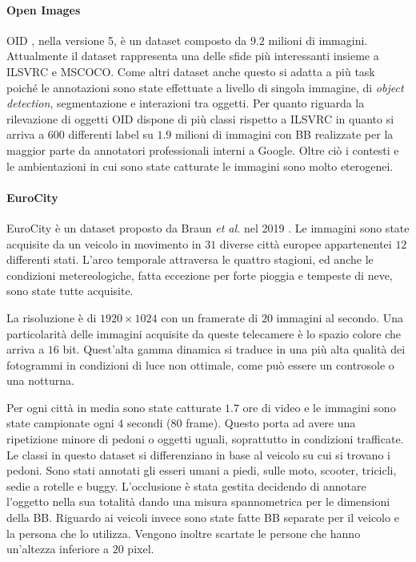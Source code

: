 \paragraph{Open Images} 
\ac{OID} \cite{krasin2017openimages}, nella versione 5, è un dataset composto da $9.2$ milioni di immagini. Attualmente il dataset rappresenta una delle sfide più interessanti insieme a \ac{ILSVRC} e \ac{MSCOCO}. Come altri dataset anche questo si adatta a più task poiché le annotazioni sono state effettuate a livello di singola immagine, di \textit{object detection}, segmentazione e interazioni tra oggetti. 
Per quanto riguarda la rilevazione di oggetti \ac{OID} dispone di più classi rispetto a \ac{ILSVRC} in quanto si arriva a $600$ differenti label su $1.9$ milioni di immagini con \ac{BB} realizzate per la maggior parte da annotatori professionali interni a Google. Oltre ciò i contesti e le ambientazioni in cui sono state catturate le immagini sono molto eterogenei.

\paragraph{EuroCity}  EuroCity è un dataset proposto da Braun \textit{et al. } nel 2019 \cite{braun2018eurocity}. Le immagini sono state acquisite da un veicolo in movimento in $31$ diverse città europee appartenentei $12$ differenti stati. L'arco temporale attraversa le quattro stagioni, ed anche le condizioni metereologiche, fatta eccezione per forte pioggia e tempeste di neve, sono state tutte acquisite. 

La risoluzione è di $1920 \times 1024$ con un framerate di $20$ immagini al secondo. Una particolarità delle immagini acquisite da queste telecamere è lo spazio colore che arriva a $16$ bit. Quest'alta gamma dinamica si traduce in una più alta qualità dei fotogrammi in condizioni di luce non ottimale, come può essere un controsole o una notturna. 

Per ogni città in media sono state catturate $1.7$ ore di video e le immagini sono state campionate ogni $4$ secondi ($80$ frame). Questo porta ad avere una ripetizione minore di pedoni o oggetti uguali, soprattutto in condizioni trafficate.
Le classi in questo dataset si differenziano in base al veicolo su cui si trovano i pedoni. Sono stati annotati gli esseri umani a piedi, sulle moto, scooter, tricicli, sedie a rotelle e buggy. 
L'occlusione è stata gestita decidendo di annotare l'oggetto nella sua totalità dando una misura spannometrica per le dimensioni della \ac{BB}. 
Riguardo ai veicoli invece sono state fatte \ac{BB} separate per il veicolo e la persona che lo utilizza. Vengono inoltre scartate le persone che hanno un'altezza inferiore a $20$ pixel.

